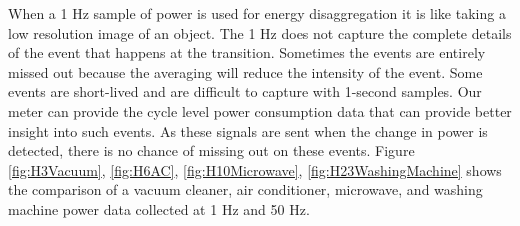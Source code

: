When a 1 Hz sample of power is used for energy disaggregation it is like taking a low resolution image of an object. The 1 Hz does not capture the complete details of the event that happens at the transition. Sometimes the events are entirely missed out because the averaging will reduce the intensity of the event. Some events are short-lived and are difficult to capture with 1-second samples. Our meter can provide the cycle level power consumption data that can provide better insight into such events. As these signals are sent when the change in power is detected, there is no chance of missing out on these events. Figure \ref{fig:H3Vacuum}, \ref{fig:H6AC}, \ref{fig:H10Microwave}, \ref{fig:H23WashingMachine} shows the comparison of a vacuum cleaner, air conditioner, microwave, and washing machine power data collected at 1 Hz and 50 Hz.
